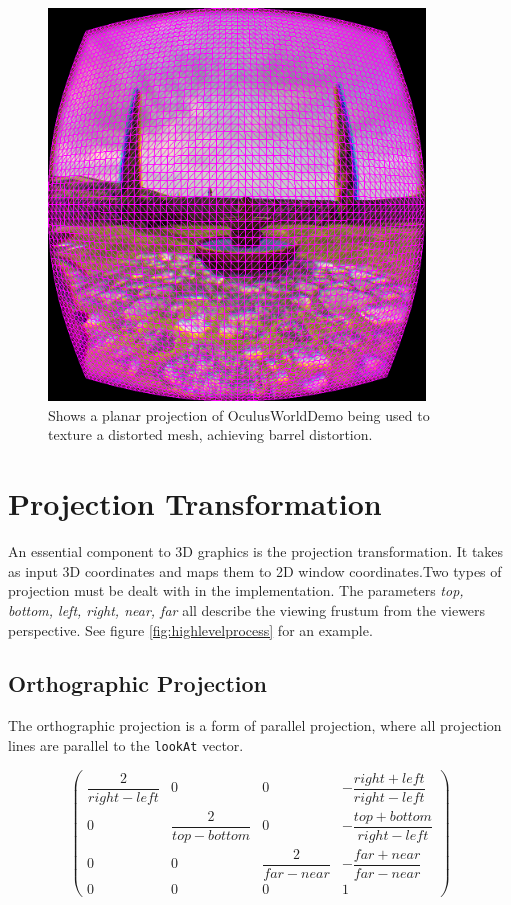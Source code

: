 \documentclass[12pt,a4paper,twoside,openright]{report}
\begin{document}
\begin{figure}[tbh]
\begin{center}
\includegraphics[width=10cm]{figs/barrelgrid.png}
\caption{Shows a planar projection of OculusWorldDemo being used to texture a distorted mesh, achieving barrel distortion.}
\label{fig:meshgrid}
\end{center}
\end{figure}

\section{Projection Transformation} \label{projections}

An essential component to 3D graphics is the projection transformation. It takes as input 3D coordinates and maps them to 2D window coordinates.Two types of projection must be dealt with in the implementation. The parameters \emph{top, bottom, left, right, near, far} all describe the viewing frustum from the viewers perspective. See figure \ref{fig:highlevelprocess} for an example.

\subsection{Orthographic Projection}
The orthographic projection is a form of parallel projection, where all projection lines are parallel to the \texttt{lookAt} vector. 

\[
\begin{pmatrix}
\dfrac{2}{right-left} & 0 & 0 & -\dfrac{right+left}{right-left} \\
0 & \dfrac{2}{top-bottom} & 0 & -\dfrac{top+bottom}{right-left} \\
0 & 0 & \dfrac{2}{far-near} & -\dfrac{far + near}{far-near} \\
0 & 0 & 0 & 1
\end{pmatrix}
\]
\end{document}
